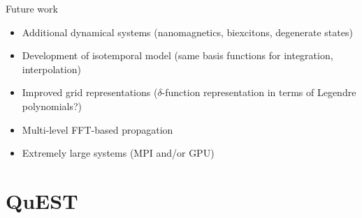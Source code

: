 \documentclass[aspectratio=169, usenames, dvipsnames]{beamer}
\begin{document}
\begin{frame}{Future work}
  \begin{itemize}
    \item Additional dynamical systems (nanomagnetics, biexcitons, degenerate states)
    \item Development of isotemporal model (same basis functions for integration, interpolation)
    \item Improved grid representations ($\delta$-function representation in terms of Legendre polynomials?)
    \item Multi-level FFT-based propagation
    \item Extremely large systems (MPI and/or GPU)
  \end{itemize}
\end{frame}

\section{QuEST}
\end{document}
